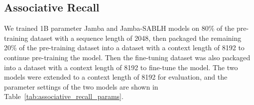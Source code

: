\documentclass{article}
\theoremstyle{plain}
\theoremstyle{definition}
\theoremstyle{remark}
\begin{document}
\subsection{Associative Recall}
\label{sec:Associative_Recall}
We trained 1B parameter Jamba and Jamba-SABLH models on 80\% of the pre-training dataset with a sequence length of 2048, then packaged the remaining 20\% of the pre-training dataset into a dataset with a context length of 8192 to continue pre-training the model. Then the fine-tuning dataset was also packaged into a dataset with a context length of 8192 to fine-tune the model. The two models were extended to a context length of 8192 for evaluation, and the parameter settings of the two models are shown in Table~\ref{tab:associative_recall_params}.
\end{document}
